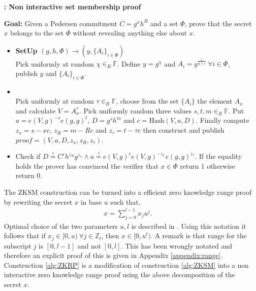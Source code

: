 \begin{algorithm}[]
\caption{\textbf{: Non interactive set membership proof}}
\textbf{Goal:} Given a Pedersen commitment $C=g^x h^R$ and a set $\Phi$, prove that the secret $x$ belongs to the set $\Phi$ without revealing anything else about $x$.
\vspace{2pt} \hline \vspace{2pt}
\begin{itemize}
  \item\textbf{SetUp $(g,h,\Phi)\xrightarrow[]{}(y,\{A_{i}\}_{i\in\Phi})$}\\
Pick uniformly at random $\chi\in_R\mathds{F}$. Define $y=g^\chi$ and $A_i=g^{\frac{1}{\chi+i}} \:\forall i\in\Phi$, publish $y$ and $\{A_i\}_{i\in\Phi}$.

\item{}\\
Pick uniformly at random $\tau\in_R\mathds{F}$, choose from the set $\{A_i\}$ the element $A_x$ and calculate $V=A_x^\tau$. Pick uniformly random three values $s,t,m\in_R\mathds{F}$. Put $a=e(V,g)^{-s}e(g,g)^t$, $D=g^sh^m$ and $c=\text{Hash}(V,a,D)$. Finally compute $z_x = s-x c$, $z_R = m-Rc$ and $z_\tau= t-\tau c$ then construct and publish $\textit{proof} = (V,a,D,z_x,z_R,z_\tau)$.

\item{}
Check if $D\overset{?}{=}C^ch^{z_R}g^{z_x}\wedge a \overset{?}{=} e(V,g)^c e(V,g)^{-z_x}e(g,g)^{z_\tau}$. If the equality holds the prover has convinced the verifier that $x\in\Phi$ return $1$ otherwise return $0$.
\end{itemize}
\label{alg:ZKSM}
\end{algorithm}

The ZKSM construction can be turned into a efficient zero knowledge range proof by rewriting the secret $x$ in base $u$ such that,
\begin{align*}
    x = \sum_{j=0}^{l-1} x_ju^j.
\end{align*}
Optimal choice of the two parameters $u,l$ is described in \cite{RANGE-SET}. 
Using this notation it follows that if $x_j\in[0,u)\: \forall j\in\mathds{Z}_l$, then $x\in[0,u^l)$. A remark is that range for the subscript $j$ is $[0,l-1]$ and not $[0,l]$.  This has been wrongly notated \cite{RANGE-SET,ZKRP_Morais} and therefore an explicit proof of this is given in Appendix \ref{appendix:range}. Construction \ref{alg:ZKRP} is a modification of construction \ref{alg:ZKSM} into a non interactive zero knowledge range proof using the above decomposition of the secret $x$.

